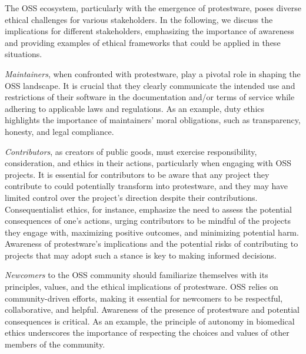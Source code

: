 \documentclass[journal,twocolumn]{IEEEtran}
\begin{document}
The OSS ecosystem, particularly with the emergence of protestware, poses diverse ethical challenges for various stakeholders. In the following, we discuss the implications for different stakeholders, emphasizing the importance of awareness and providing examples of ethical frameworks that could be applied in these situations.

\textit{Maintainers}, when confronted with protestware, play a pivotal role in shaping the OSS landscape. It is crucial that they clearly communicate the intended use and restrictions of their software in the documentation and/or terms of service while adhering to applicable laws and regulations. As an example, duty ethics highlights the importance of maintainers' moral obligations, such as transparency, honesty, and legal compliance.

\textit{Contributors}, as creators of public goods, must exercise responsibility, consideration, and ethics in their actions, particularly when engaging with OSS projects. It is essential for contributors to be aware that any project they contribute to could potentially transform into protestware, and they may have limited control over the project's direction despite their contributions. Consequentialist ethics, for instance, emphasize the need to assess the potential consequences of one's actions, urging contributors to be mindful of the projects they engage with, maximizing positive outcomes, and minimizing potential harm. Awareness of protestware's implications and the potential risks of contributing to projects that may adopt such a stance is key to making informed decisions.

\textit{Newcomers} to the OSS community should familiarize themselves with its principles, values, and the ethical implications of protestware. OSS relies on community-driven efforts, making it essential for newcomers to be respectful, collaborative, and helpful. Awareness of the presence of protestware and potential consequences is critical. As an example, the principle of autonomy in biomedical ethics underscores the importance of respecting the choices and values of other members of the community.
\end{document}
